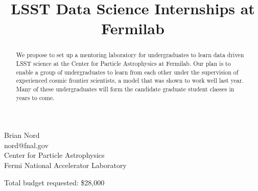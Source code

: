 \title{%
LSST Data Science Internships at Fermilab}
\date{} %


\maketitle

\vspace{-1.5cm}
\begin{center}
Brian Nord \\ nord@fnal.gov \\
Center for Particle Astrophysics\\
Fermi National Accelerator Laboratory\\
\vspace{0.3cm}
\end{center}
\vspace{1.5cm}

\begin{abstract}
\normalsize
We propose to set up a mentoring laboratory for undergraduates to
learn data driven LSST science at the Center for Particle
Astrophysics at Fermilab.
Our plan is to enable a group of undergraduates to learn from
each other under the supervision of experienced cosmic
frontier scientists, a model that was shown to work
well last year. Many of these  undergraduates will
form the candidate graduate student classes in years to come.
\end{abstract}

Total budget requested: \$28,000\par

